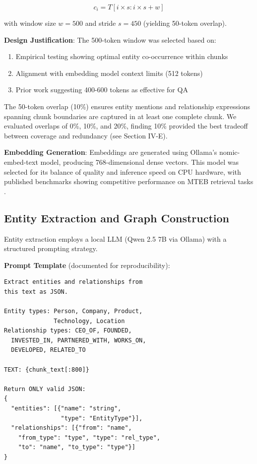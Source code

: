 \documentclass[conference]{IEEEtran}
\begin{document}
\begin{equation}
    c_i = T[i \times s : i \times s + w]
\end{equation}

with window size $w = 500$ and stride $s = 450$ (yielding 50-token overlap).

\textbf{Design Justification}: The 500-token window was selected based on:
\begin{enumerate}
    \item Empirical testing showing optimal entity co-occurrence within chunks
    \item Alignment with embedding model context limits (512 tokens)
    \item Prior work suggesting 400-600 tokens as effective for QA \cite{ram2023context}
\end{enumerate}

The 50-token overlap (10\%) ensures entity mentions and relationship expressions spanning chunk boundaries are captured in at least one complete chunk. We evaluated overlaps of 0\%, 10\%, and 20\%, finding 10\% provided the best tradeoff between coverage and redundancy (see Section IV-E).

\textbf{Embedding Generation}: Embeddings are generated using Ollama's nomic-embed-text model, producing 768-dimensional dense vectors. This model was selected for its balance of quality and inference speed on CPU hardware, with published benchmarks showing competitive performance on MTEB retrieval tasks \cite{muennighoff2023mteb}.

\subsection{Entity Extraction and Graph Construction}

Entity extraction employs a local LLM (Qwen 2.5 7B via Ollama) with a structured prompting strategy.

\textbf{Prompt Template} (documented for reproducibility):

\begin{verbatim}
Extract entities and relationships from 
this text as JSON.

Entity types: Person, Company, Product, 
              Technology, Location
Relationship types: CEO_OF, FOUNDED, 
  INVESTED_IN, PARTNERED_WITH, WORKS_ON, 
  DEVELOPED, RELATED_TO

TEXT: {chunk_text[:800]}

Return ONLY valid JSON:
{
  "entities": [{"name": "string", 
                "type": "EntityType"}],
  "relationships": [{"from": "name", 
    "from_type": "type", "type": "rel_type", 
    "to": "name", "to_type": "type"}]
}
\end{verbatim}
\end{document}
